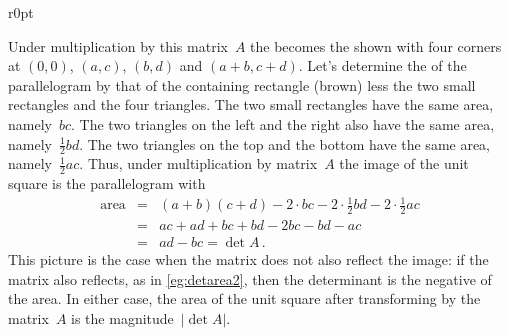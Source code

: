 \begin{wrapfigure}{r}{0pt} 
\end{wrapfigure}
Under multiplication by this matrix~\(A\) the  becomes the  shown with four corners at \((0,0)\), \((a,c)\), \((b,d)\) and \((a+b,c+d)\).
Let's determine the  of the parallelogram by that of the containing rectangle (brown) less the two small rectangles and the four triangles.
The two small rectangles have the same area, namely~\(bc\).
The two triangles on the left and the right also have the same area, namely~\(\frac12bd\).
The two triangles on the top and the bottom have the same area, namely~\(\frac12ac\).
Thus, under multiplication by matrix~\(A\) the image of the unit square is the parallelogram with 
\begin{eqnarray*}
\text{area}&=&(a+b)(c+d)-2\cdot bc-2\cdot\frac12bd-2\cdot\frac12ac
\\&=&ac+ad+bc+bd-2bc-bd-ac
\\&=&ad-bc=\det A\,.
\end{eqnarray*}
This picture is the case when the matrix does not also reflect the image:  if the matrix also reflects, as in \cref{eg:detarea2}, then the determinant is the negative of the area.
In either case, the area of the unit square after transforming by the matrix~\(A\) is the magnitude~\(|\det A|\).


